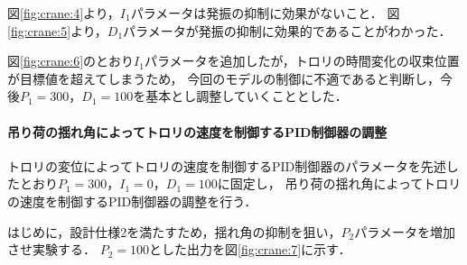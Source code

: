 \documentclass[dvipdfmx,titlepage,a4j]{jsarticle}  %
\begin{document}
図\ref{fig:crane:4}より，$I_1$パラメータは発振の抑制に効果がないこと．
図\ref{fig:crane:5}より，$D_1$パラメータが発振の抑制に効果的であることがわかった．

図\ref{fig:crane:6}のとおり$I_1$パラメータを追加したが，トロリの時間変化の収束位置が目標値を超えてしまうため，
今回のモデルの制御に不適であると判断し，今後$P_1 = 300$，$D_1 = 100$を基本とし調整していくこととした．

\paragraph{吊り荷の揺れ角によってトロリの速度を制御するPID制御器の調整\\}
トロリの変位によってトロリの速度を制御するPID制御器のパラメータを先述したとおり$P_1 = 300$，$I_1 = 0$，$D_1 = 100$に固定し，
吊り荷の揺れ角によってトロリの速度を制御するPID制御器の調整を行う．

はじめに，設計仕様2を満たすため，揺れ角の抑制を狙い，$P_2$パラメータを増加させ実験する．
$P_2 = 100$とした出力を図\ref{fig:crane:7}に示す．
\end{document}
